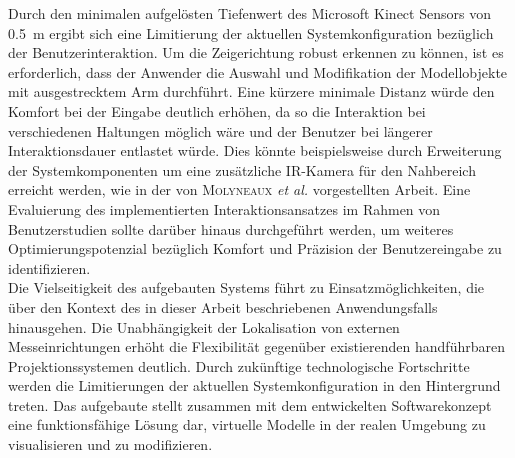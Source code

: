 Durch den minimalen aufgelösten Tiefenwert des Microsoft Kinect Sensors von \SI{0,5}{\meter} ergibt sich eine Limitierung der aktuellen Systemkonfiguration bezüglich der Benutzerinteraktion. Um die Zeigerichtung robust erkennen zu können, ist es erforderlich, dass der Anwender die Auswahl und Modifikation der Modellobjekte mit ausgestrecktem Arm durchführt. Eine kürzere minimale Distanz würde den Komfort bei der Eingabe deutlich erhöhen, da so die Interaktion bei verschiedenen Haltungen möglich wäre und der Benutzer bei längerer Interaktionsdauer entlastet würde. Dies könnte beispielsweise durch Erweiterung der Systemkomponenten um eine zusätzliche IR-Kamera für den Nahbereich erreicht werden, wie in der von \textsc{Molyneaux} \textit{et al.} \cite{Molyneaux2012} vorgestellten Arbeit. Eine Evaluierung des implementierten Interaktionsansatzes im Rahmen von Benutzerstudien sollte darüber hinaus durchgeführt werden, um weiteres Optimierungspotenzial bezüglich Komfort und Präzision der Benutzereingabe zu identifizieren.\\

Die Vielseitigkeit des aufgebauten Systems führt zu Einsatzmöglichkeiten, die über den Kontext des in dieser Arbeit beschriebenen Anwendungsfalls hinausgehen. Die Unabhängigkeit der Lokalisation von externen Messeinrichtungen erhöht die Flexibilität gegenüber existierenden handführbaren Projektionssystemen deutlich. Durch zukünftige technologische Fortschritte werden die Limitierungen der aktuellen Systemkonfiguration in den Hintergrund treten. Das aufgebaute \kps{} stellt zusammen mit dem entwickelten Softwarekonzept eine funktionsfähige Lösung dar, virtuelle Modelle in der realen Umgebung zu visualisieren und zu modifizieren.


